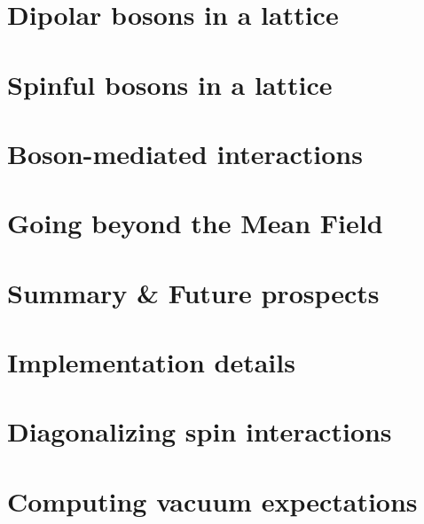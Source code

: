 \documentclass[titlepage]{report}
\begin{document}
\chapter{Dipolar bosons in a lattice}\label{ch4}


\chapter{Spinful bosons in a lattice}\label{ch5}


\chapter{Boson-mediated interactions}\label{ch6}


\chapter{Going beyond the Mean Field}\label{ch7}


\chapter{Summary \& Future prospects}\label{ch8}


\fancyhead[L]{\appendixname\ \thechapter\ --\ \leftmark}

\begin{appendices}
\chapter{Implementation details}

\chapter{Diagonalizing spin interactions}\label{app:rotation}

\chapter{Computing vacuum expectations}\label{app:wick}

\end{appendices}

% 


\end{document}
